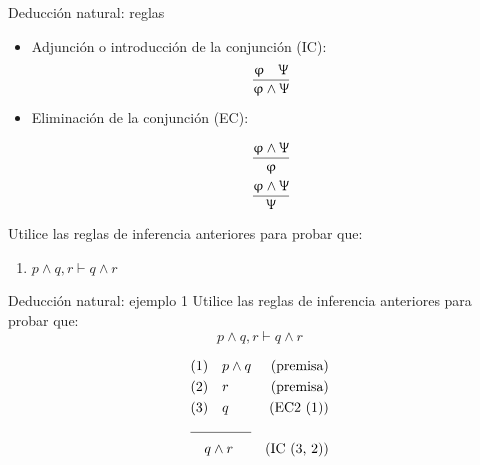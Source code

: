 \documentclass{beamer}
\begin{document}
\begin{frame}{Deducción natural: reglas}
  \begin{itemize}
    \item Adjunción o introducción de la conjunción (IC):
    $$\dfrac{\upvarphi \quad \Uppsi}{\upvarphi \land \Uppsi}$$

    \item Eliminación de la conjunción (EC):
          \begin{multicols}{2}
            \noindent
            \begin{equation}
              \dfrac{\upvarphi \land \Uppsi}{\upvarphi}
            \end{equation}
            \begin{equation}
              \dfrac{\upvarphi \land \Uppsi}{\Uppsi}
            \end{equation}
          \end{multicols}
  \end{itemize}

  Utilice las reglas de inferencia anteriores para probar que:
  \begin{enumerate}
    \item $p \land q, r \vdash q\land r$
  \end{enumerate}
\end{frame}


\begin{frame}{Deducción natural: ejemplo 1}
  Utilice las reglas de inferencia anteriores para probar que:
  $$p \land q, r \vdash q\land r$$

  \begin{align*}
    &(1) \quad p \land q &\text{(premisa)}\\
    &(2) \quad r &\text{(premisa)}\\
    &(3) \quad q &\text{(EC2 (1))}\\
    \cline{1-2}
    &\quad q \land r &\text{(IC (3, 2))}
  \end{align*}
\end{frame}
\end{document}
